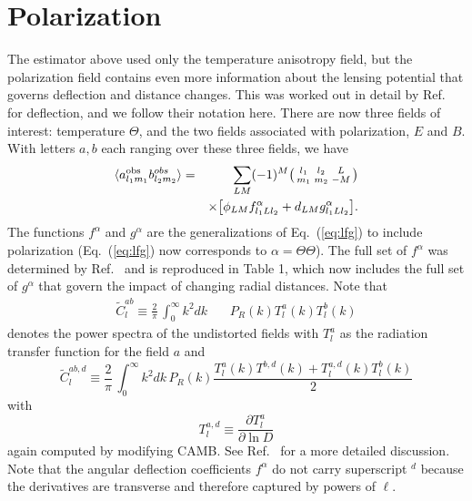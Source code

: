 \documentclass[prd,amsmath,amssymb,floatfix,superscriptaddress,nofootinbib,twocolumn]{revtex4-1}
\def\be{\begin{equation}}
\def\ee{\end{equation}}
\def\bea{\begin{eqnarray}}
\def\eea{\end{eqnarray}}
\newcommand{\vs}{\nonumber\\}
\newcommand{\ec}[1]{Eq.~(\ref{eq:#1})}
\newcommand{\wh}[1]{{\color{red} #1}}
\begin{document}
\section{Polarization}

The estimator above used only the temperature anisotropy field, but the polarization field contains even more information about the lensing potential that governs deflection and distance changes. This was worked out in detail by Ref.~\cite{Okamoto:2003zw} for deflection, and we follow their notation here. There are now three fields of interest: temperature $\Theta$, and the two fields associated with polarization, $E$ and $B$. With letters $a,b$ each ranging over these three fields, we have 
\bea
\langle a^{\rm obs}_{l_{1}m_{1}}b^{obs}_{l_{2}m_{2}}\rangle &=& \sum_{LM}(-1)^{M}\bigl(\begin{smallmatrix} l_1 & l_2 & L \\ m_1 & m_2 & -M  \end{smallmatrix}\bigr)\nonumber \\
&&\times
\big[ \phi_{LM}f^{\alpha}_{l_{1}Ll_{2}} + d_{LM}g^{\alpha}_{l_{1}Ll_{2}} \big] 
.\eea
The functions $f^\alpha$ and $g^\alpha$ are the generalizations of \ec{lfg} to include polarization (\ec{lfg} now corresponds to $\alpha=\Theta\Theta$). The full set of $f^{\alpha}$ was determined by Ref.~\cite{Okamoto:2003zw} and is reproduced in Table 1, which now includes the full set of $g^{\alpha}$ that govern the impact of changing radial distances. Note
that
\bea
\tilde{C}^{ab}_{l} \equiv \frac{2}{\pi}\,\int_0^\infty k^{2}dk \,&&{P}_{R}(k) T^{a}_l(k) T^b_l(k) \eea
denotes the power spectra of the undistorted fields with $T_l^a$ as the radiation transfer
function for the field $a$ and \be
\tilde{C}^{ab,d}_{l} \equiv  \frac{2}{\pi}\,\int_0^\infty k^{2}dk \,{P}_{R}(k)\frac{T_l^{a}(k)T^{b,d}(k)+T_l^{a,d}(k)T_l^{b}(k)}{2} 
\ee
with 
\begin{equation}
T_l^{a,d} \equiv \frac{\partial T_l^a}{\partial \ln D}
\end{equation}
again computed by modifying CAMB.  
 See Ref.~\cite{Hu:1997de} for a more detailed discussion.
Note that the angular deflection coefficients $f^\alpha$ do not carry superscript $^d$ because the derivatives are transverse and therefore captured by powers of $\ell$. %
\end{document}
